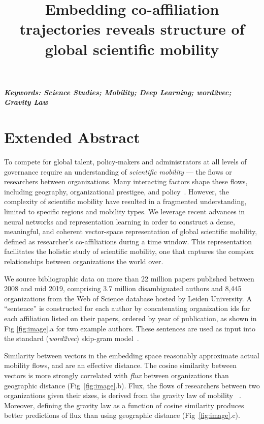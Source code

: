 \documentclass[a4paper,12pt]{article}
\title{Embedding co-affiliation trajectories reveals structure of global scientific mobility}
\author[]{} %
\date{}
\begin{document}
\maketitle
\thispagestyle{fancy}

\vspace{-6em}
\begin{center}
\textbf{\textit{Keywords: Science Studies; Mobility; Deep Learning; word2vec; Gravity Law }}
\newline
\end{center}

\section*{Extended Abstract}
To compete for global talent, policy-makers and administrators at all levels of governance require an understanding of \textit{scientific mobility} — the flows or researchers between organizations. 
Many interacting factors shape these flows, including geography, organizational prestigee, and policy~\autocite{deville_career_2014, clauset_systematic_2015}.
However, the complexity of scientific mobility have resulted in a fragmented understanding, limited to specific regions and mobility types.
We leverage recent advances in neural networks and representation learning in order to construct a dense, meaningful, and coherent vector-space representation of global scientific mobility, defined as researcher's co-affiliations during a time window. 
This representation facilitates the holistic study of scientific mobility, one that captures the complex relationships between organizations the world over. 

We source bibliographic data on more than 22 million papers published between 2008 and mid 2019, comprising 3.7 million disambiguated authors and 8,445 organizations from the Web of Science database hosted by Leiden University. 
A ``sentence'' is constructed for each author by concatenating organization ids for each affiliation listed on their papers, ordered by year of publication, as shown in Fig \ref{fig:image}.a for two example authors. 
These sentences are used as input into the standard (\textit{word2vec}) skip-gram model~\autocite{mikolov_distributed_2013}. 

Similarity between vectors in the embedding space reasonably approximate actual mobility flows, and are an effective distance. 
The cosine similarity between vectors is more strongly correlated with \textit{flux} between organizations than geographic distance (Fig~\ref{fig:image}.b). 
Flux, the flows of researchers between two organizations given their sizes, is derived from the gravity law of mobility ~\autocite{simini_universal_2012}.
Moreover, defining the gravity law as a function of cosine similarity produces better predictions of flux than using geographic distance (Fig~\ref{fig:image}.c). 
\end{document}
